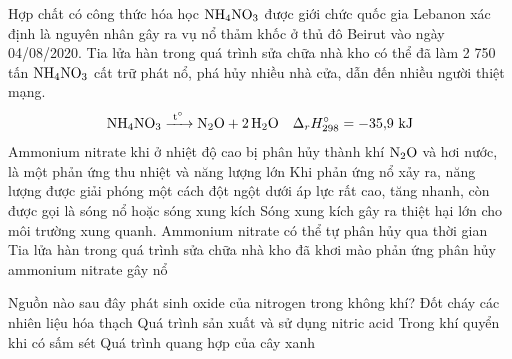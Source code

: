 \documentclass[12pt,a4paper]{article}
\begin{document}
\begin{ex}
Hợp chất có công thức hóa học $\ce{NH4NO3}$ được giới chức quốc gia Lebanon xác định là nguyên nhân gây ra vụ nổ thảm khốc ở thủ đô Beirut vào ngày 04/08/2020. Tia lửa hàn trong quá trình sửa chữa nhà kho có thể đã làm 2 750 tấn $\ce{NH4NO3}$ cất trữ phát nổ, phá hủy nhiều nhà cửa, dẫn đến nhiều người thiệt mạng.
\[\ce{NH4NO3 ->[t^\circ] N2O + 2H2O} \quad \Delta_r H^\circ_{298} = -35{,}9\text{ kJ}\]
\choiceTF
{Ammonium nitrate khi ở nhiệt độ cao bị phân hủy thành khí $\ce{N2O}$ và hơi nước, là một phản ứng thu nhiệt và năng lượng lớn}
{\True Khi phản ứng nổ xảy ra, năng lượng được giải phóng một cách đột ngột dưới áp lực rất cao, tăng nhanh, còn được gọi là sóng nổ hoặc sóng xung kích}
{\True Sóng xung kích gây ra thiệt hại lớn cho môi trường xung quanh. Ammonium nitrate có thể tự phân hủy qua thời gian}
{\True Tia lửa hàn trong quá trình sửa chữa nhà kho đã khơi mào phản ứng phân hủy ammonium nitrate gây nổ}

\end{ex}

\begin{ex}
Nguồn nào sau đây phát sinh oxide của nitrogen trong không khí?
\choiceTF
{\True Đốt cháy các nhiên liệu hóa thạch}
{\True Quá trình sản xuất và sử dụng nitric acid}
{\True Trong khí quyển khi có sấm sét}
{Quá trình quang hợp của cây xanh}

\end{ex}
\end{document}
